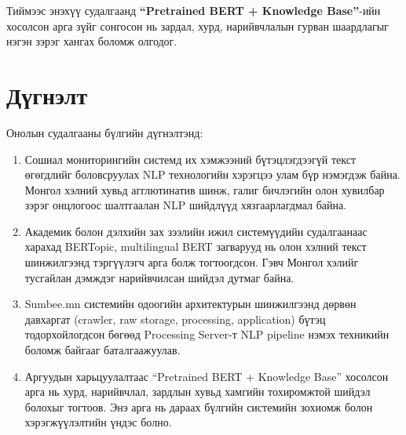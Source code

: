 Тиймээс энэхүү судалгаанд \textbf{``Pretrained BERT + Knowledge Base''}-ийн хосолсон арга зүйг сонгосон нь зардал, хурд, нарийвчлалын гурван шаардлагыг нэгэн зэрэг хангах боломж олгодог.

\section{Дүгнэлт}

Онолын судалгааны бүлгийн дүгнэлтэнд:

\begin{enumerate}
    \item Сошиал мониторингийн системд их хэмжээний бүтэцлэгдээгүй текст өгөгдлийг боловсруулах NLP технологийн хэрэгцээ улам бүр нэмэгдэж байна. Монгол хэлний хувьд агглютинатив шинж, галиг бичлэгийн олон хувилбар зэрэг онцлогоос шалтгаалан NLP шийдлүүд хязгаарлагдмал байна.

    \item Академик болон дэлхийн зах зээлийн ижил системүүдийн судалгаанаас харахад BERTopic, multilingual BERT загварууд нь олон хэлний текст шинжилгээнд тэргүүлэгч арга болж тогтоогдсон. Гэвч Монгол хэлийг тусгайлан дэмждэг нарийвчилсан шийдэл дутмаг байна.

    \item Sumbee.mn системийн одоогийн архитектурын шинжилгээнд дөрвөн давхаргат (crawler, raw storage, processing, application) бүтэц тодорхойлогдсон бөгөөд Processing Server-т NLP pipeline нэмэх техникийн боломж байгааг баталгаажуулав.

    \item Аргуудын харьцуулалтаас ``Pretrained BERT + Knowledge Base'' хосолсон арга нь хурд, нарийвчлал, зардлын хувьд хамгийн тохиромжтой шийдэл болохыг тогтоов. Энэ арга нь дараах бүлгийн системийн зохиомж болон хэрэгжүүлэлтийн үндэс болно.
\end{enumerate}
